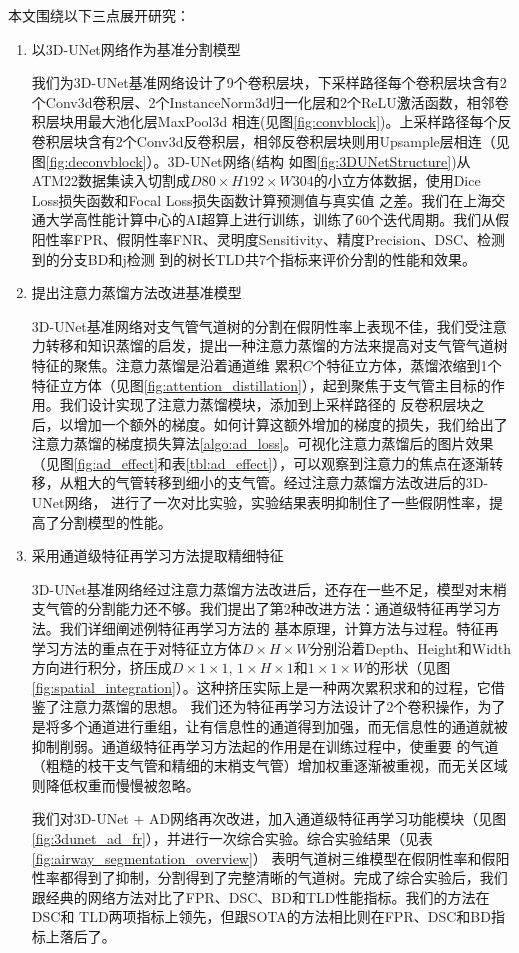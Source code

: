 本文围绕以下三点展开研究：
\begin{enumerate}
    \item {\heiti 以3D-UNet网络作为基准分割模型}

    我们为3D-UNet基准网络设计了9个卷积层块，下采样路径每个卷积层块含有2个Conv3d卷积层、2个InstanceNorm3d归一化层和2个ReLU激活函数，相邻卷积层块用最大池化层MaxPool3d
    相连(见图\ref{fig:convblock})。上采样路径每个反卷积层块含有2个Conv3d反卷积层，相邻反卷积层块则用Upsample层相连（见图\ref{fig:deconvblock}）。3D-UNet网络(结构
    如图\ref{fig:3DUNetStructure})从ATM22数据集读入切割成$D80 \times H192 \times W304$的小立方体数据，使用Dice Loss损失函数和Focal Loss损失函数计算预测值与真实值
    之差。我们在上海交通大学高性能计算中心的AI超算上进行训练，训练了60个迭代周期。我们从假阳性率FPR、假阴性率FNR、灵明度Sensitivity、精度Precision、DSC、检测到的分支BD和j检测
    到的树长TLD共7个指标来评价分割的性能和效果。

    \item {\heiti 提出注意力蒸馏方法改进基准模型}

    3D-UNet基准网络对支气管气道树的分割在假阴性率上表现不佳，我们受注意力转移和知识蒸馏的启发，提出一种注意力蒸馏的方法来提高对支气管气道树特征的聚焦。注意力蒸馏是沿着通道维
    累积$C$个特征立方体，蒸馏浓缩到1个特征立方体（见图\ref{fig:attention_distillation}），起到聚焦于支气管主目标的作用。我们设计实现了注意力蒸馏模块，添加到上采样路径的
    反卷积层块之后，以增加一个额外的梯度。如何计算这额外增加的梯度的损失，我们给出了注意力蒸馏的梯度损失算法\ref{algo:ad_loss}。可视化注意力蒸馏后的图片效果
    （见图\ref{fig:ad_effect}和表\ref{tbl:ad_effect}），可以观察到注意力的焦点在逐渐转移，从粗大的气管转移到细小的支气管。经过注意力蒸馏方法改进后的3D-UNet网络，
    进行了一次对比实验，实验结果表明抑制住了一些假阴性率，提高了分割模型的性能。

    \item {\heiti 采用通道级特征再学习方法提取精细特征}

    3D-UNet基准网络经过注意力蒸馏方法改进后，还存在一些不足，模型对末梢支气管的分割能力还不够。我们提出了第2种改进方法：通道级特征再学习方法。我们详细阐述例特征再学习方法的
    基本原理，计算方法与过程。特征再学习方法的重点在于对特征立方体$D \times H \times W$分别沿着Depth、Height和Width方向进行积分，挤压成$D \times 1 \times 1$, 
    $1 \times H \times 1$和$1 \times 1 \times W$的形状（见图\ref{fig:spatial_integration}）。这种挤压实际上是一种两次累积求和的过程，它借鉴了注意力蒸馏的思想。
    我们还为特征再学习方法设计了2个卷积操作，为了是将多个通道进行重组，让有信息性的通道得到加强，而无信息性的通道就被抑制削弱。通道级特征再学习方法起的作用是在训练过程中，使重要
    的气道（粗糙的枝干支气管和精细的末梢支气管）增加权重逐渐被重视，而无关区域则降低权重而慢慢被忽略。

    我们对3D-UNet + AD网络再次改进，加入通道级特征再学习功能模块（见图\ref{fig:3dunet_ad_fr}），并进行一次综合实验。综合实验结果（见表\ref{fig:airway_segmentation_overview}）
    表明气道树三维模型在假阴性率和假阳性率都得到了抑制，分割得到了完整清晰的气道树。完成了综合实验后，我们跟经典的网络方法对比了FPR、DSC、BD和TLD性能指标。我们的方法在DSC和
    TLD两项指标上领先，但跟SOTA的方法相比则在FPR、DSC和BD指标上落后了。
\end{enumerate}

